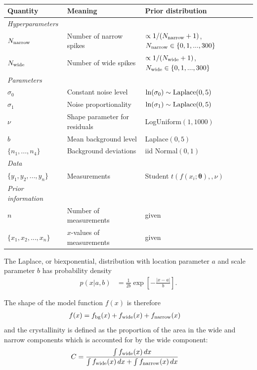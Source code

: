 \documentclass[a4paper, 12pt]{article}
\newcommand{\params}{\boldsymbol{\theta}}
\newcommand{\x}{x}
\begin{document}
\begin{table}
\centering
\begin{tabular}{|lll|}
\hline
{\bf Quantity}      &   {\bf Meaning}   &  {\bf Prior distribution}\\
\hline
{\em Hyperparameters} & &\\
$N_{\rm narrow}$   &   Number of narrow spikes    &  $\propto 1/(N_{\rm narrow}+1)$, $N_{\rm narrow} \in \{0, 1, ..., 300\}$ \\
$N_{\rm wide}$   &   Number of wide spikes    &  $\propto 1/(N_{\rm wide}+1)$,
$N_{\rm wide} \in \{0, 1, ..., 300\}$ \\

\hline
{\em Parameters}& &\\
$\sigma_0$ &    Constant noise level  &   $\ln(\sigma_0) \sim \textnormal{Laplace}(0,5)$\\
$\sigma_1$ &    Noise proportionality   &  $\ln(\sigma_1) \sim \textnormal{Laplace}(0,5)$ \\
$\nu$     &   Shape parameter for residuals   &   LogUniform$(1, 1000)$\\
$b$       & Mean background level       & Laplace$(0, 5)$\\
$\{n_1, ..., n_4\}$  & Background deviations & iid Normal$(0,1)$\\
\hline
{\em Data}&&\\
\hline
$\{y_1, y_2, ..., y_n\}$  &   Measurements    & Student $t(f(x_i; \params), ,\nu)$\\
\hline
{\em Prior information}&&\\
\hline
$n$ & Number of measurements & given\\
$\{\x_1, \x_2, ..., \x_n\}$  & $\x$-values of measurements & given \\
\hline
\end{tabular}
\caption{\label{tab:priors}}
\end{table}

The Laplace, or biexponential, distribution with location parameter $a$ and
scale parameter $b$ has probability density
\begin{align}
p(x | a, b) &= \frac{1}{2b}\exp\left[-\frac{|x - a|}{b}\right].
\end{align}


The shape of the model function $f(x)$ is therefore
\begin{align}
f(\x) &= f_{\rm bg}(\x) + f_{\rm wide}(\x) + f_{\rm narrow}(\x)
\end{align}
and the crystallinity is defined as the proportion of the area in the
wide and narrow components which is accounted for by the wide component:
\begin{align}
C &= \frac{\int f_{\rm wide}(\x) \, d\x}
          {\int f_{\rm wide}(\x) \, d\x + \int f_{\rm narrow}(\x) \, d\x}
\end{align}




\end{document}
